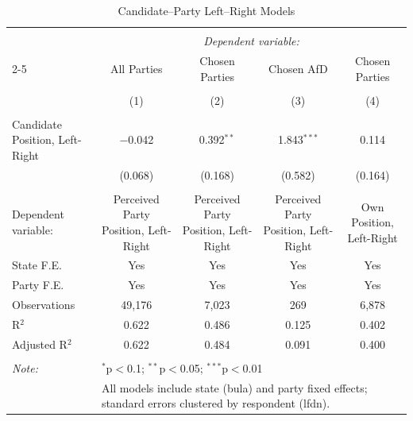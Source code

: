 
\begin{table}[!htbp] \centering 
  \caption{Candidate–Party Left–Right Models} 
  \label{tab:lr_models} 
\begin{tabular}{@{\extracolsep{5pt}}lcccc} 
\\[-1.8ex]\hline 
\hline \\[-1.8ex] 
 & \multicolumn{4}{c}{\textit{Dependent variable:}} \\ 
\cline{2-5} 
 & All Parties & Chosen Parties & Chosen AfD & Chosen Parties \\ 
\\[-1.8ex] & (1) & (2) & (3) & (4)\\ 
\hline \\[-1.8ex] 
 Candidate Position, Left-Right & $-$0.042 & 0.392$^{**}$ & 1.843$^{***}$ & 0.114 \\ 
  & (0.068) & (0.168) & (0.582) & (0.164) \\ 
 \hline \\[-1.8ex] 
Dependent variable: & Perceived Party Position, Left-Right & Perceived Party Position, Left-Right & Perceived Party Position, Left-Right & Own Position, Left-Right \\ 
State F.E. & Yes & Yes & Yes & Yes \\ 
Party F.E. & Yes & Yes & Yes & Yes \\ 
Observations & 49,176 & 7,023 & 269 & 6,878 \\ 
R$^{2}$ & 0.622 & 0.486 & 0.125 & 0.402 \\ 
Adjusted R$^{2}$ & 0.622 & 0.484 & 0.091 & 0.400 \\ 
\hline 
\hline \\[-1.8ex] 
\textit{Note:}  & \multicolumn{4}{l}{$^{*}$p$<$0.1; $^{**}$p$<$0.05; $^{***}$p$<$0.01} \\ 
 & \multicolumn{4}{l}{All models include state (bula) and party fixed effects; standard errors clustered by respondent (lfdn).} \\ 
\end{tabular} 
\end{table} 
